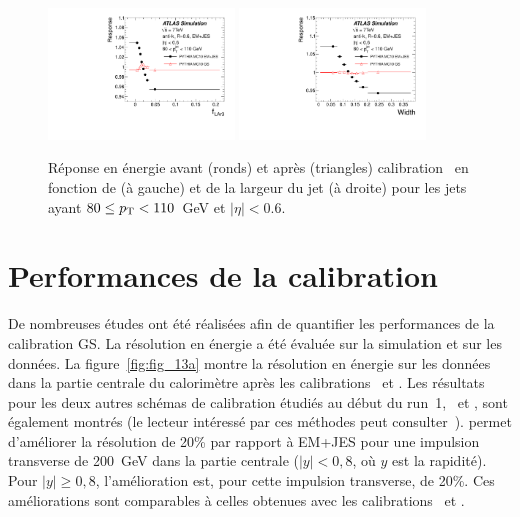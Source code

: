 \begin{figure}[!ht]
\centering
\includegraphics[width=0.44\textwidth]{figures/fig_46a.pdf}
\includegraphics[width=0.44\textwidth]{figures/fig_46b.pdf}
\caption{R\'eponse en \'energie avant (ronds) et apr\`es (triangles) calibration \GS~en fonction de \fem{} (\`a gauche) et de la largeur du jet \width{} (\`a droite) pour les jets ayant $80 \le p_{\mathrm{T}} < 110$~GeV et $|\eta|<0.6$.
}
\label{fig:GSapply}
\end{figure}

\section{Performances de la calibration~\GS}
\label{sec:performanceGS}

De nombreuses études ont été réalisées afin de quantifier les performances de la calibration GS. %
La r\'esolution en \'energie a été évaluée sur la simulation et sur les données. La figure~\ref{fig:fig_13a} montre la r\'esolution en \'energie sur les donn\'ees dans la partie centrale du calorim\`etre apr\`es les calibrations \EMJES~et \GS. Les r\'esultats pour les deux autres sch\'emas de calibration \'etudi\'es au d\'ebut du run~1, \LCW~et \GCW, sont \'egalement montr\'es (le lecteur int\'eress\'e par ces m\'ethodes peut consulter~\cite{Aad:2011he}). \GS{} permet d'améliorer la résolution de 20\% par rapport à EM+JES pour une impulsion transverse de 200~GeV dans la partie centrale ($|y|<0,8$, o\`u $y$ est la rapidit\'e). Pour $|y|\geq0,8$, l'am\'elioration est, pour cette impulsion transverse, de 20\%. Ces am\'eliorations sont comparables \`a celles obtenues avec les calibrations \GCW~et \LCW. 

